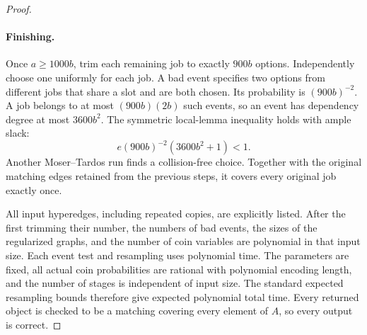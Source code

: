 \documentclass[11pt]{article}
\theoremstyle{definition}\newtheorem{algorithm}{Algorithm}[section]
\numberwithin{equation}{section}
\theoremstyle{remark}\newtheorem*{remark}{Remark}
\begin{document}
\begin{proof}
\paragraph{Finishing.}
Once $a\ge1000b$, trim each remaining job to exactly $900b$ options.
Independently choose one uniformly for each job. A bad event specifies
two options from different jobs that share a slot and are both chosen.
Its probability is $(900b)^{-2}$. A job belongs to at most
$(900b)(2b)$ such events, so an event has dependency degree at most
$3600b^2$. The symmetric local-lemma inequality holds with ample slack:
\[
 e(900b)^{-2}(3600b^2+1)<1.
\]
Another Moser--Tardos run finds a collision-free choice. Together with
the original matching edges retained from the previous steps, it
covers every original job exactly once.

All input hyperedges, including repeated copies, are explicitly listed.
After the first trimming their number, the numbers of bad events,
the sizes of the regularized graphs, and the number of coin variables
are polynomial in that input size. Each event test and resampling uses
polynomial time. The parameters are fixed, all actual coin probabilities
are rational with polynomial encoding length, and the number of stages
is independent of input size. The standard expected resampling bounds
therefore give expected polynomial total time. Every returned object is
checked to be a matching covering every element of $A$, so every output is correct.
\end{proof}
\end{document}
